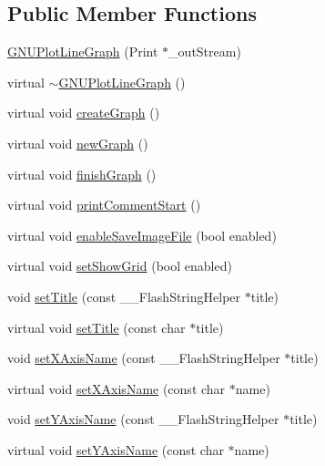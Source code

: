 \subsection*{Public Member Functions}
\begin{DoxyCompactItemize}
\item 
\hyperlink{class_g_n_u_plot_line_graph_ab014e7473d49843586b58ad89f647801}{G\+N\+U\+Plot\+Line\+Graph} (Print $\ast$\+\_\+out\+Stream)
\item 
virtual \hyperlink{class_g_n_u_plot_line_graph_ae63dcb831b4df37c1d1c877e0d0e671c}{$\sim$\+G\+N\+U\+Plot\+Line\+Graph} ()
\item 
virtual void \hyperlink{class_g_n_u_plot_x_y_graph_base_a8389f830ff330dfb705e00d31053e130}{create\+Graph} ()
\item 
virtual void \hyperlink{class_g_n_u_plot_base_a4d4da234cfdeb99ec3228ef7b2df8a50}{new\+Graph} ()
\item 
virtual void \hyperlink{class_g_n_u_plot_base_aa4b0574c35fbee4dc5f25451eaf956dd}{finish\+Graph} ()
\item 
virtual void \hyperlink{class_g_n_u_plot_base_a219601bd41203477ae73a18d18dd7443}{print\+Comment\+Start} ()
\item 
virtual void \hyperlink{class_serial_graph_a28b020807c52c113685aa6a31f836c52}{enable\+Save\+Image\+File} (bool enabled)
\item 
virtual void \hyperlink{class_serial_graph_abf488e449d6d786bc01478793d0094ad}{set\+Show\+Grid} (bool enabled)
\item 
void \hyperlink{class_serial_graph_a4db09b008589914b71b2ee8b1873db7a}{set\+Title} (const \+\_\+\+\_\+\+Flash\+String\+Helper $\ast$title)
\item 
virtual void \hyperlink{class_serial_graph_ad726b2c84cec50c2d4bfe769e62a9bcd}{set\+Title} (const char $\ast$title)
\item 
void \hyperlink{class_serial_graph_afdb759a860c41de2fc4cfe78519b9fc0}{set\+X\+Axis\+Name} (const \+\_\+\+\_\+\+Flash\+String\+Helper $\ast$title)
\item 
virtual void \hyperlink{class_serial_graph_ac7f30036f5006091af51204a4d9efaf2}{set\+X\+Axis\+Name} (const char $\ast$name)
\item 
void \hyperlink{class_serial_graph_abfc46c15cf8e1b4362a7f51cb11c7bdb}{set\+Y\+Axis\+Name} (const \+\_\+\+\_\+\+Flash\+String\+Helper $\ast$title)
\item 
virtual void \hyperlink{class_serial_graph_ab0c675c8682959261f79dcf37b04148c}{set\+Y\+Axis\+Name} (const char $\ast$name)

\end{DoxyCompactItemize}
